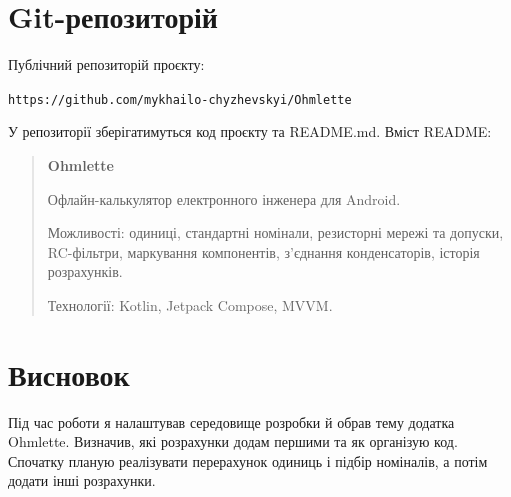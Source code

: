 \documentclass[14pt,a4paper]{extarticle}
\begin{document}
\section{Git-репозиторій}
Публічний репозиторій проєкту:
\begin{center}
\small\texttt{https://github.com/mykhailo-chyzhevskyi/Ohmlette}
\end{center}
У репозиторії зберігатимуться код проєкту та README.md. Вміст README:

\begin{quote}
\textbf{Ohmlette}

Офлайн-калькулятор електронного інженера для Android.

Можливості: одиниці, стандартні номінали, резисторні мережі та допуски, RC-фільтри, маркування компонентів, з'єднання конденсаторів, історія розрахунків.

Технології: Kotlin, Jetpack Compose, MVVM.
\end{quote}

\section*{Висновок}
Під час роботи я налаштував середовище розробки й обрав тему додатка Ohmlette. Визначив, які розрахунки додам першими та як організую код. Спочатку планую реалізувати перерахунок одиниць і підбір номіналів, а потім додати інші розрахунки.
\end{document}
